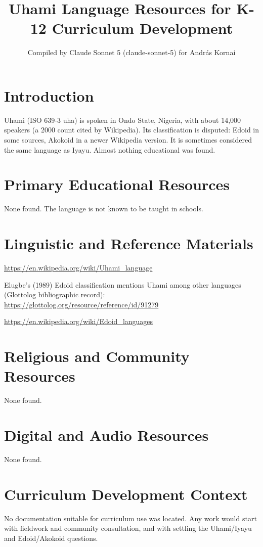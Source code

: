 \documentclass[12pt]{article}
\title{Uhami Language Resources for K-12 Curriculum Development}
\author{Compiled by Claude Sonnet 5 (claude-sonnet-5) for Andr\'as Kornai}
\date{}
\begin{document}
\maketitle

\section{Introduction}
Uhami (ISO 639-3 uha) is spoken in Ondo State, Nigeria, with about 14,000 speakers (a 2000 count cited by Wikipedia). Its classification is disputed: Edoid in some sources, Akokoid in a newer Wikipedia version. It is sometimes considered the same language as Iyayu. Almost nothing educational was found.

\section{Primary Educational Resources}
None found. The language is not known to be taught in schools.

\section{Linguistic and Reference Materials}
\url{https://en.wikipedia.org/wiki/Uhami_language}

Elugbe's (1989) Edoid classification mentions Uhami among other languages (Glottolog bibliographic record): \url{https://glottolog.org/resource/reference/id/91279}

\url{https://en.wikipedia.org/wiki/Edoid_languages}

\section{Religious and Community Resources}
None found.

\section{Digital and Audio Resources}
None found.

\section{Curriculum Development Context}
No documentation suitable for curriculum use was located. Any work would start with fieldwork and community consultation, and with settling the Uhami/Iyayu and Edoid/Akokoid questions.
\end{document}

